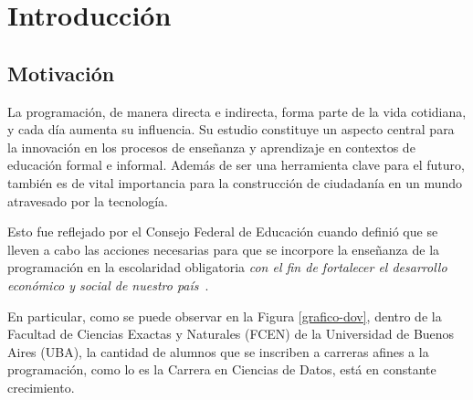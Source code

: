 \documentclass[11pt,a4paper,twoside,openany]{tesis}
\begin{document}

\def\autor{Carla de Erausquin}
\def\tituloTesis{Caracterización de trayectorias educativas a partir de producciones de código}
\def\runtitulo{Caracterización de trayectorias educativas a partir de producciones de código}
\def\runtitle{Characterization of educational trajectories based on Code Productions}
\def\director{Matías López y Rosenfeld}
\def\codirector{Pablo Turjanski}
\def\lugar{Buenos Aires, 2024}


\frontmatter
\pagestyle{empty}


\cleardoublepage

\cleardoublepage

\cleardoublepage

\cleardoublepage
\tableofcontents

\mainmatter
\pagestyle{headings}



\chapter{Introducción}
\section{Motivación}

La programación, de manera directa e indirecta, forma parte de la vida cotidiana, y cada día aumenta su influencia. Su estudio constituye un aspecto central para la innovación en los procesos de enseñanza y aprendizaje en contextos de educación formal e informal. Además de ser una herramienta clave para el futuro, también es de vital importancia para la construcción de ciudadanía en un mundo atravesado por la tecnología. 

Esto fue reflejado por el Consejo Federal de Educación cuando definió que se lleven a cabo las acciones necesarias para que se incorpore la enseñanza de la programación en la escolaridad obligatoria \emph{con el fin de fortalecer el desarrollo económico y social de nuestro país}~\cite{resolucionProgramar}.

En particular, como se puede observar en la Figura \ref{grafico-dov}, dentro de la Facultad de Ciencias Exactas y Naturales (FCEN) de la Universidad de Buenos Aires (UBA), la cantidad de alumnos que se inscriben a carreras afines a la programación, como lo es la Carrera en Ciencias de Datos, está en constante crecimiento.
\end{document}
